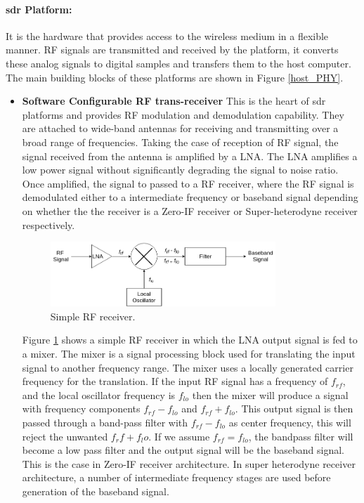 \paragraph{\ac{sdr} Platform:} It is the hardware that provides access to the wireless medium in a flexible manner.
\ac{RF} signals are transmitted and received by the platform, it converts these analog signals to digital samples and transfers them to the host computer.
The main building blocks of these platforms are shown in Figure \ref{host_PHY}.
\begin{itemize}
\item{\textbf{Software Configurable \ac{RF} trans-receiver}} This is the heart of \ac{sdr} platforms and provides \ac{RF} modulation and demodulation capability.
They are attached to wide-band antennas for receiving and transmitting over a broad range of frequencies.
Taking the case of reception of RF signal, the signal received from the antenna is amplified by a \ac{LNA}.
The \ac{LNA} amplifies a low power signal without significantly degrading the signal to noise ratio.
Once amplified, the signal to passed to a \ac{RF} receiver, where the \ac{RF} signal is demodulated either to a intermediate frequency or baseband signal depending on whether the the receiver is a Zero-IF receiver or Super-heterodyne receiver respectively.\\

\begin{figure}[h!]
\centering
\includegraphics[width=0.8\textwidth]{Figure/RF_receiver.png}
\caption{Simple \ac{RF} receiver.}
\label{rf_receiver}
\end{figure}

Figure \ref{rf_receiver} shows a simple \ac{RF} receiver in which the \ac{LNA} output signal is fed to a mixer.
The mixer is a signal processing block used for translating the input signal to another frequency range.
The mixer uses a locally generated carrier frequency for the translation. 
If the input \ac{RF} signal has a frequency of $f_{rf}$, and the local oscillator frequency is $f_{lo}$ then the mixer will produce a signal with frequency components $f_{rf}-f_{lo}$ and $f_{rf}+f_{lo}$.
This output signal is then passed through a band-pass filter with $f_{rf}-f_{lo}$ as center frequency, this will reject the unwanted $f_rf+f_lo$.
If we assume $f_{rf}=f_{lo}$, the bandpass filter will become a low pass filter and the output signal will be the baseband signal.
This is the case in Zero-IF receiver architecture.
In super heterodyne receiver architecture, a number of intermediate frequency stages are used before generation of the baseband signal.\\


\end{itemize}
